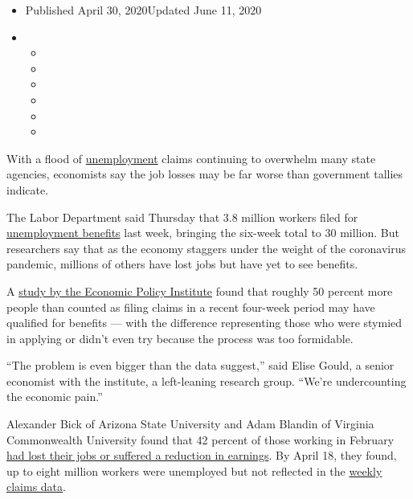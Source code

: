 \begin{itemize}
\item
  Published April 30, 2020Updated June 11, 2020
\item
  \begin{itemize}
  \item
  \item
  \item
  \item
  \item
  \item
  \end{itemize}
\end{itemize}

With a flood of
\href{https://www.nytimes.com/2020/05/21/business/economy/coronavirus-unemployment-claims.html}{unemployment}
claims continuing to overwhelm many state agencies, economists say the
job losses may be far worse than government tallies indicate.

The Labor Department said Thursday that 3.8 million workers filed for
\href{https://www.nytimes.com/2020/06/11/us/politics/unemployment-benefits-coronavirus.html}{unemployment
benefits} last week, bringing the six-week total to 30 million. But
researchers say that as the economy staggers under the weight of the
coronavirus pandemic, millions of others have lost jobs but have yet to
see benefits.

A
\href{https://www.epi.org/blog/unemployment-filing-failures-new-survey-confirms-that-millions-of-jobless-were-unable-to-file-an-unemployment-insurance-claim/}{study
by the Economic Policy Institute} found that roughly 50 percent more
people than counted as filing claims in a recent four-week period may
have qualified for benefits --- with the difference representing those
who were stymied in applying or didn't even try because the process was
too formidable.

``The problem is even bigger than the data suggest,'' said Elise Gould,
a senior economist with the institute, a left-leaning research group.
``We're undercounting the economic pain.''

Alexander Bick of Arizona State University and Adam Blandin of Virginia
Commonwealth University found that 42 percent of those working in
February
\href{https://alexbick.weebly.com/uploads/1/0/1/3/101306056/bb_covid.pdf}{had
lost their jobs or suffered a reduction in earnings}. By April 18, they
found, up to eight million workers were unemployed but not reflected in
the
\href{https://www.nytimes.com/2020/06/04/business/economy/coronavirus-unemployment-claims.html}{weekly
claims data}.

